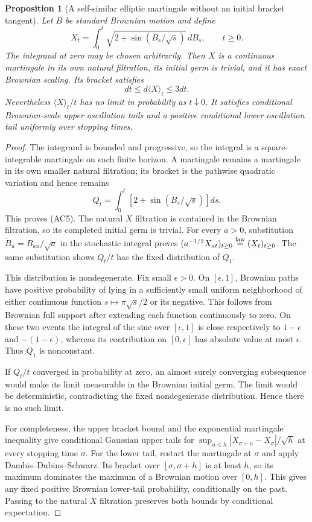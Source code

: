 \documentclass[11pt]{article}
\newtheorem{proposition}[theorem]{Proposition}
\theoremstyle{definition}\newtheorem{definition}[theorem]{Definition}
\theoremstyle{remark}\newtheorem{remark}[theorem]{Remark}
\begin{document}
\begin{proposition}[A self-similar elliptic martingale without an initial bracket tangent]
\label{prop:selfsimilar-elliptic-no-tangent}
Let $B$ be standard Brownian motion and define
\[
 X_t=\int_0^t\sqrt{2+\sin(B_s/\sqrt s)}\,dB_s,
 \qquad t\ge0.
 \tag{AC4}
\]
The integrand at zero may be chosen arbitrarily. Then $X$ is a
continuous martingale in its own natural filtration, its initial germ
is trivial, and it has exact Brownian scaling. Its bracket satisfies
\[
 dt\le d\langle X\rangle_t\le3dt.
 \tag{AC5}
\]
Nevertheless $\langle X\rangle_t/t$ has no limit in probability as
$t\downarrow0$. It satisfies conditional Brownian-scale upper
oscillation tails and a positive conditional lower oscillation tail
uniformly over stopping times.
\end{proposition}
\begin{proof}
The integrand is bounded and progressive, so the integral is a
square-integrable martingale on each finite horizon. A martingale
remains a martingale in its own smaller natural filtration; its
bracket is the pathwise quadratic variation and hence remains
\[
 Q_t=\int_0^t[2+\sin(B_s/\sqrt s)]ds.
\]
This proves (AC5). The natural $X$ filtration is contained in the
Brownian filtration, so its completed initial germ is trivial.
For every $a>0$, substitution $\widetilde B_u=B_{au}/\sqrt a$
in the stochastic integral proves
$(a^{-1/2}X_{at})_{t\ge0}\stackrel{\rm law}=(X_t)_{t\ge0}$.
The same substitution shows $Q_t/t$ has the fixed distribution of
$Q_1$.

This distribution is nondegenerate. Fix small $\epsilon>0$.
On $[\epsilon,1]$, Brownian paths have positive probability of lying
in a sufficiently small uniform neighborhood of either continuous
function $s\mapsto\pi\sqrt s/2$ or its negative. This follows from
Brownian full support after extending each function continuously to
zero. On these two events the integral of the sine over
$[\epsilon,1]$ is close respectively to $1-\epsilon$ and
$-(1-\epsilon)$, whereas its contribution on $[0,\epsilon]$ has
absolute value at most $\epsilon$. Thus $Q_1$ is nonconstant.

If $Q_t/t$ converged in probability at zero, an almost surely
converging subsequence would make its limit measurable in the
Brownian initial germ. The limit would be deterministic, contradicting
the fixed nondegenerate distribution. Hence there is no such limit.

For completeness, the upper bracket bound and the exponential
martingale inequality give conditional Gaussian upper tails for
$\sup_{u\le h}|X_{\sigma+u}-X_\sigma|/\sqrt h$ at every
stopping time $\sigma$. For the lower tail, restart the martingale
at $\sigma$ and apply Dambis--Dubins--Schwarz. Its bracket over
$[\sigma,\sigma+h]$ is at least $h$, so its maximum dominates
the maximum of a Brownian motion over $[0,h]$. This gives any fixed
positive Brownian lower-tail probability, conditionally on the
past. Passing to the natural $X$ filtration preserves both bounds
by conditional expectation.
\end{proof}
\end{document}
